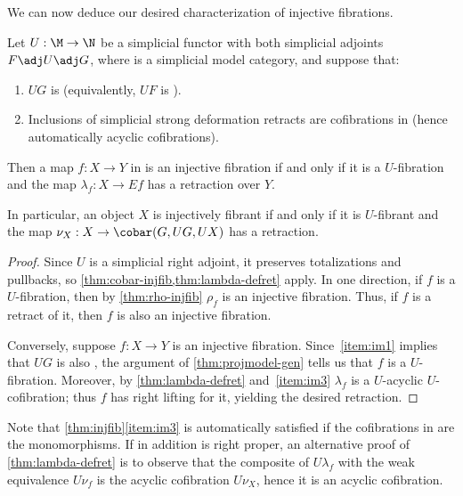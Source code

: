 We can now deduce our desired characterization of injective fibrations.

\begin{thm}\label{thm:injfib}
  Let $U:\M\to\N$ be a simplicial functor with both simplicial adjoints $F\adj U\adj G$, where \N is a simplicial model category, and suppose that:
  \begin{enumerate}
  \item $U G$ is \qufibt (equivalently, $U F$ is \qucoft).\label{item:im1}
  \item Inclusions of simplicial strong deformation retracts are cofibrations in \N (hence automatically acyclic cofibrations).\label{item:im3}
  \end{enumerate}
  Then a map $f:X\to Y$ in \M is an injective fibration if and only if it is a $U$-fibration and the map $\lambda_f : X\to E f$ has a retraction over $Y$.

  In particular, an object $X$ is injectively fibrant if and only if it is $U$-fibrant and the map $\nu_X : X \to \cobar(G,UG,UX)$ has a retraction.
\end{thm}
\begin{proof}
  Since $U$ is a simplicial right adjoint, it preserves totalizations and pullbacks, so \cref{thm:cobar-injfib,thm:lambda-defret} apply.
  In one direction, if $f$ is a $U$-fibration, then by \cref{thm:rho-injfib} $\rho_f$ is an injective fibration.
  Thus, if $f$ is a retract of it, then $f$ is also an injective fibration.

  Conversely, suppose $f:X\to Y$ is an injective fibration.
  Since~\ref{item:im1} implies that $U G$ is also \qfibt, the argument of \cref{thm:projmodel-gen} tells us that $f$ is a $U$-fibration.
  Moreover, by \cref{thm:lambda-defret} and~\ref{item:im3} $\lambda_f$ is a $U$-acyclic $U$-cofibration; thus $f$ has right lifting for it, yielding the desired retraction.
\end{proof}

Note that \cref{thm:injfib}\ref{item:im3} is automatically satisfied if the cofibrations in \N are the monomorphisms.
If in addition \N is right proper, an alternative proof of \cref{thm:lambda-defret} is to observe that the composite of $U\lambda_f$ with the weak equivalence $U\nu_f$ is the acyclic cofibration $U\nu_X$, hence it is an acyclic cofibration.


